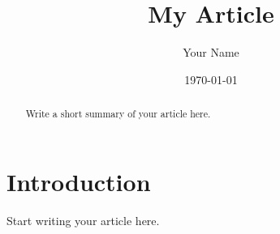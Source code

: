 \documentclass{article}
\title{My Article}
\author{Your Name}
\date{\today}
\begin{document}
\maketitle

\begin{abstract}
Write a short summary of your article here.
\end{abstract}

\section{Introduction}
Start writing your article here.
\end{document}
